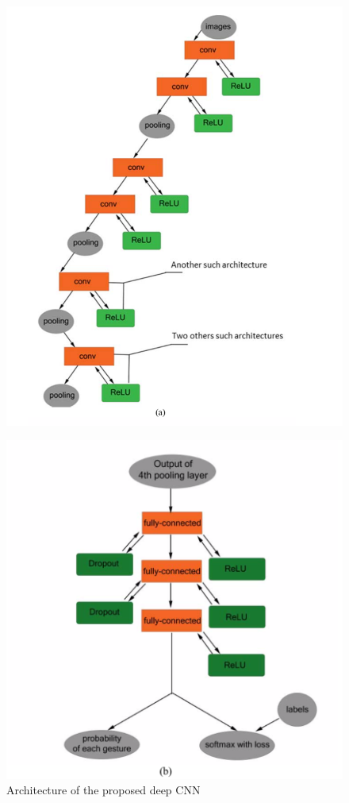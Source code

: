 \documentclass[12pt]{report}
\begin{document}
                    \begin{figure}[h]
                        \centering
                          \includegraphics[width=.8\textwidth]{./images/tiny_a.png}
                    \end{figure}
                        \bigbreak
                     \begin{figure}
                        \centering
                        \includegraphics[width=\textwidth]{./images/tiny_b.png}
                        \caption{Architecture of the proposed deep CNN }\label{fig:tiny_architecture}
                    \end{figure}
\end{document}
